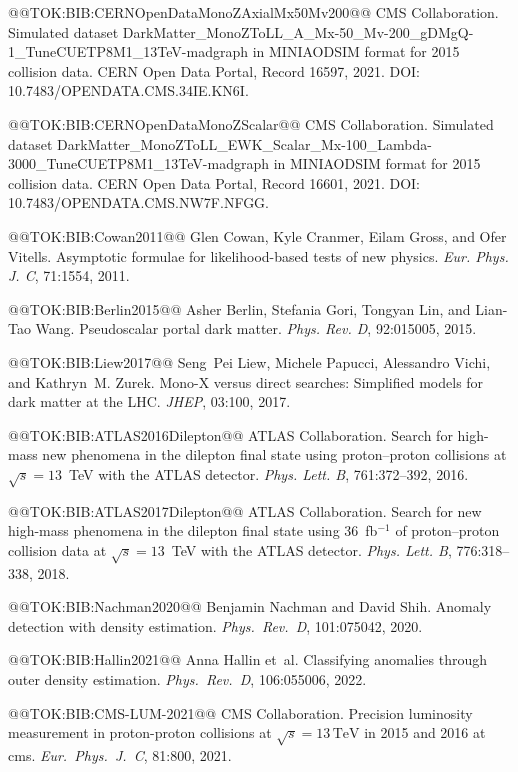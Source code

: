 \documentclass{article}
\begin{document}
@@TOK:BIB:CERNOpenDataMonoZAxialMx50Mv200@@ {CMS Collaboration}.
  {Simulated dataset
  DarkMatter\_MonoZToLL\_A\_Mx-50\_Mv-200\_gDMgQ-1\_TuneCUETP8M1\_13TeV-madgraph
  in MINIAODSIM format for 2015 collision data}.
  CERN Open Data Portal, Record 16597, 2021.
  DOI: 10.7483/OPENDATA.CMS.34IE.KN6I.

@@TOK:BIB:CERNOpenDataMonoZScalar@@ {CMS Collaboration}.
  {Simulated dataset
  DarkMatter\_MonoZToLL\_EWK\_Scalar\_Mx-100\_Lambda-3000\_TuneCUETP8M1\_13TeV-madgraph
  in MINIAODSIM format for 2015 collision data}.
  CERN Open Data Portal, Record 16601, 2021.
  DOI: 10.7483/OPENDATA.CMS.NW7F.NFGG.

@@TOK:BIB:Cowan2011@@ Glen Cowan, Kyle Cranmer, Eilam Gross, and Ofer Vitells.
  Asymptotic formulae for likelihood-based tests of new physics.
  {\em Eur. Phys. J. C}, 71:1554, 2011.

@@TOK:BIB:Berlin2015@@ Asher Berlin, Stefania Gori, Tongyan Lin, and Lian-Tao Wang.
  Pseudoscalar portal dark matter.
  {\em Phys. Rev. D}, 92:015005, 2015.

@@TOK:BIB:Liew2017@@ Seng~Pei Liew, Michele Papucci, Alessandro Vichi, and Kathryn~M. Zurek.
  Mono-{X} versus direct searches: Simplified models for dark matter at
  the {LHC}.
  {\em JHEP}, 03:100, 2017.

@@TOK:BIB:ATLAS2016Dilepton@@ {ATLAS Collaboration}.
  Search for high-mass new phenomena in the dilepton final state using
  proton--proton collisions at $\sqrt{s}=13$~{TeV} with the {ATLAS} detector.
  {\em Phys. Lett. B}, 761:372--392, 2016.

@@TOK:BIB:ATLAS2017Dilepton@@ {ATLAS Collaboration}.
  Search for new high-mass phenomena in the dilepton final state using
  36~{fb}$^{-1}$ of proton--proton collision data at $\sqrt{s}=13$~{TeV} with
  the {ATLAS} detector.
  {\em Phys. Lett. B}, 776:318--338, 2018.

@@TOK:BIB:Nachman2020@@ Benjamin Nachman and David Shih.
  Anomaly detection with density estimation.
  {\em Phys.\ Rev.\ D}, 101:075042, 2020.

@@TOK:BIB:Hallin2021@@ Anna Hallin et~al.
  Classifying anomalies through outer density estimation.
  {\em Phys.\ Rev.\ D}, 106:055006, 2022.

@@TOK:BIB:CMS-LUM-2021@@ {CMS Collaboration}.
  Precision luminosity measurement in proton-proton collisions at
  $\sqrt{s}=13\,\mathrm{TeV}$ in 2015 and 2016 at cms.
  {\em Eur.\ Phys.\ J.\ C}, 81:800, 2021.
\end{document}
